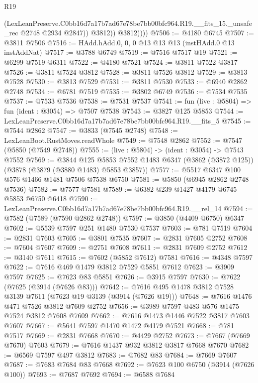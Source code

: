 \begin{lexlean}{R19}
\begin{coremodule}
                  (LexLeanPreserve.C0bb16d7a17b7ad67e78be7bb00bfc964.R19.__fits_15._unsafe_rec
                    @2748
                    @2934
                    @2847))
                @3812))
            @3812))))
@7506 := @4180 @6745
@7507 := @3811 @7506
@7516 := HAdd.hAdd.{0, 0, 0} @13 @13 @13 (instHAdd.{0} @13 instAddNat)
@7517 := @3788 @6749
@7519 := @7516 @7517 @19
@7521 := @6299 @7519 @6311
@7522 := @4180 @7521
@7524 := @3811 @7522 @3817
@7526 := @3811 @7524 @3812
@7528 := @3811 @7526 @3812
@7529 := @3813 @7528
@7530 := @3813 @7529
@7531 := @3811 @7530
@7533 := @6940 @2862 @2748
@7534 := @6781 @7519
@7535 := @3802 @6749
@7536 := @7534 @7535
@7537 := @7533 @7536
@7538 := @7531 @7537
@7541 := fun (live : @5804) => fun (ident : @3054) => @7507 @7538
@7543 := @3827 @125 @5853
@7544 := LexLeanPreserve.C0bb16d7a17b7ad67e78be7bb00bfc964.R19.__fits_5
@7545 := @7544 @2862
@7547 := @3833 (@7545 @2748)
@7548 := LexLeanBoot.RustMoves.readWhole
@7549 := @7548 @2862
@7552 := @7547 (@5850 (@7549 @2748))
@7555 := (live : @5804) -> (ident : @3054) -> @7543 @7552
@7569 := @3844
    @125
    @5853
    @7552
    @1483
    @6347
    (@3862 (@3872 @125))
    (@3878 (@3879 (@3880 @1483) @5853 @3857))
@7577 := @5517 @6347 @100 @576 @1466 @1481 @7506 @7538 @6750
@7581 := @5850 (@6945 @2862 @2748 @7536)
@7582 := @7577 @7581
@7589 := @6382 @239 @1427 @4179 @6745 @5853 @6750 @6418
@7590 := LexLeanPreserve.C0bb16d7a17b7ad67e78be7bb00bfc964.R19.__rel_14
@7594 := @7582 (@7589 (@7590 @2862 @2748))
@7597 := @3850 (@4409 @6750) @6347
@7602 := @5539 @7597 @251 @1480 @7530 @7537
@7603 := @781 @7519
@7604 := @2831 @7603
@7605 := @3801 @7535
@7607 := @2831 @7605 @2752
@7608 := @7604 @7607
@7609 := @2751 @7608
@7611 := @2831 @7609 @2752
@7612 := @3140 @7611
@7615 := @7602 (@5852 @7612) @7581
@7616 := @4348 @7597
@7622 := @7616 @469 @1479 @3812 @7529 @5851 @7612
@7623 := @3909 @7597
@7625 := @7623 @83 @5851
@7626 := @3915 @7597
@7630 := @7622 (@7625 (@3914 (@7626 @83)))
@7642 := @7616 @495 @1478 @3812 @7528 @3139 @7611 (@7623 @19 @3139 (@3914 (@7626 @19)))
@7648 := @7616 @1476 @471 @7526 @3812 @7609 @2752
@7656 := @3989 @7597 @483 @576 @1475 @7524 @3812 @7608 @7609
@7662 := @7616 @1473 @1446 @7522 @3817 @7603 @7607
@7667 := @5641 @7597 @1470 @1472 @4179 @7521
@7668 := @781 @7517
@7669 := @2831 @7668
@7670 := @4429 @2752
@7673 := @7667 (@7669 @7670) @7603
@7679 := @7616 @1437 @932 @3812 @3817 @7668 @7670
@7682 := @6569 @7597 @497 @3812
@7683 := @7682 @83
@7684 := @7669 @7607
@7687 := @7683 @7684 @83 @7668
@7692 := @7623 @100 @6750 (@3914 (@7626 @100))
@7693 := @7687 @7692
@7694 := @6588 @7684

\end{coremodule}
\end{lexlean}
